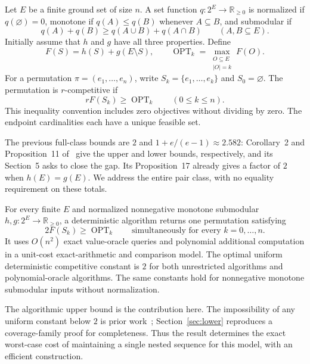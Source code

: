 \documentclass[acmsmall,screen,nonacm,11pt,natbib=false]{acmart}
\newcommand{\OPT}{\operatorname{OPT}}
\begin{document}
Let $E$ be a finite ground set of size $n$. A set function $q:2^E\to
\mathbb R_{\ge0}$ is normalized if $q(\varnothing)=0$, monotone if
$q(A)\le q(B)$ whenever $A\subseteq B$, and submodular if
\[
 q(A)+q(B)\ge q(A\cup B)+q(A\cap B)\qquad(A,B\subseteq E).
\]
Initially assume that $h$ and $g$ have all three properties. Define
\begin{equation}\label{eq:objective}
 F(S)=h(S)+g(E\setminus S),\qquad
 \OPT_k=\max_{\substack{O\subseteq E\\|O|=k}}F(O).
\end{equation}
For a permutation $\pi=(e_1,\ldots,e_n)$, write
$S_k=\{e_1,\ldots,e_k\}$ and $S_0=\varnothing$.
The permutation is $r$-competitive if
\begin{equation}\label{eq:competitive}
 rF(S_k)\ge\OPT_k\qquad(0\le k\le n).
\end{equation}
This inequality convention includes zero objectives without dividing by zero.
The endpoint cardinalities each have a unique feasible set.

The previous full-class bounds are $2$ and $1+e/(e-1)\approx2.582$:
Corollary~2 and Proposition~11 of~\cite{DKLS26} give the upper and lower
bounds, respectively, and its Section~5 asks to close the gap. Its
Proposition~17 already gives a factor of $2$ when $h(E)=g(E)$.
We address the entire pair class, with no equality requirement on these totals.

\begin{theorem}\label{thm:main}
For every finite $E$ and normalized nonnegative monotone submodular
$h,g:2^E\to\mathbb R_{\ge0}$, a deterministic algorithm returns one permutation
satisfying
\[
 2F(S_k)\ge\OPT_k\qquad\text{simultaneously for every }k=0,\ldots,n.
\]
It uses $O(n^2)$ exact value-oracle queries and polynomial additional
computation in a unit-cost exact-arithmetic and comparison model.
The optimal uniform deterministic competitive constant is $2$ for both
unrestricted algorithms and polynomial-oracle algorithms.
The same constants hold for nonnegative monotone submodular inputs without
normalization.
\end{theorem}

The algorithmic upper bound is the contribution here. The impossibility of
any uniform constant below $2$ is prior work~\cite[Proposition~11]{DKLS26};
Section~\ref{sec:lower} reproduces a coverage-family proof for completeness.
Thus the result determines the exact worst-case cost of maintaining a single
nested sequence for this model, with an efficient construction.
\end{document}
